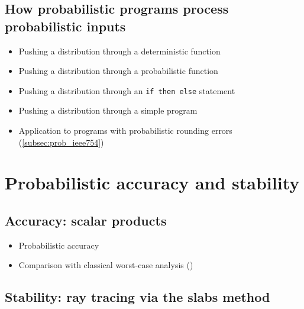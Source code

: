 \documentclass[10pt,conference]{IEEEtran}
\begin{document}
\subsection{How probabilistic programs process probabilistic inputs}
\begin{itemize}
\item Pushing a distribution through a deterministic function
\item Pushing a distribution through a probabilistic function
\item Pushing a distribution through an \texttt{if then else} statement
\item Pushing a distribution through a simple program
\item Application to programs with probabilistic rounding errors (\cref{subsec:prob_ieee754})
\end{itemize}

\section{Probabilistic accuracy and stability}

\subsection{Accuracy: scalar products}

\begin{itemize}
\item Probabilistic accuracy
\item Comparison with classical worst-case analysis (\cite[3.1]{higham2002accuracy})
\end{itemize}

\subsection{Stability: ray tracing via the slabs method}



\end{document}
